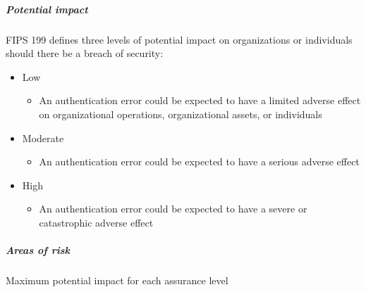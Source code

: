 \documentclass{article}
\begin{document}
                    \subparagraph{Potential
                    impact}

                    FIPS 199 defines three levels of potential
                    impact on organizations or individuals should
                    there be a breach of security:

                    \begin{itemize}
                        \item Low
                        \begin{itemize}
                            \item An authentication error could be expected to have a limited adverse effect on organizational operations, organizational assets, or individuals
                        \end{itemize}
                        \item Moderate
                        \begin{itemize}
                            \item An authentication error could be expected to have a serious adverse effect
                        \end{itemize}
                        \item High
                        \begin{itemize}
                            \item An authentication error could be expected to have a severe or catastrophic adverse effect
                        \end{itemize}
                    \end{itemize}
                    \subparagraph{Areas of risk}
                    Maximum potential impact for each   assurance level
\end{document}

